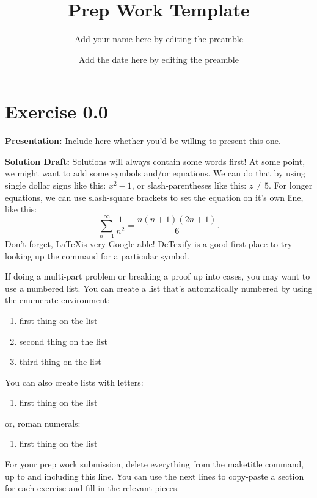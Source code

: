 \documentclass{article}
\title{Prep Work Template}
\author{Add your name here by editing the preamble}
\date{Add the date here by editing the preamble}
\begin{document}
\maketitle



\section*{Exercise 0.0}  

\noindent\textbf{Presentation:} Include here whether you'd be willing to present this one. 

\vspace{0.5cm} %


\noindent\textbf{Solution Draft:} 
Solutions will always contain some words first!  At some point, we might want to add some symbols and/or equations.  We can do that by using single dollar signs like this: $x^2 - 1$, or slash-parentheses like this: \(z \neq 5\).  For longer equations, we can use slash-square brackets to set the equation on it's own line, like this:
\[ \sum_{n=1}^\infty \frac{1}{n^2} = \frac{n(n+1)(2n+1)}{6}. \]
Don't forget, \LaTeX is very Google-able!  DeTexify is a good first place to try looking up the command for a particular symbol. 

If doing a multi-part problem or breaking a proof up into cases, you may want to use a numbered list.  You can create a list that's automatically numbered by using the enumerate environment:
\begin{enumerate}
    \item first thing on the list
    \item second thing on the list
    \item third thing on the list
\end{enumerate}

\noindent You can also create lists with letters:
\begin{enumerate}[label=\alph*.]
    \item first thing on the list
\end{enumerate}
\noindent or, roman numerals:
\begin{enumerate}[label=\roman*.]
    \item first thing on the list
\end{enumerate}

For your prep work submission, delete everything from the maketitle command, up to and including this line.  You can use the next lines to copy-paste a section for each exercise and fill in the relevant pieces. 
\end{document}

